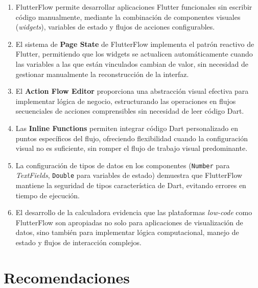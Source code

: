 \documentclass[12pt,a4paper]{article}
\begin{document}
\begin{enumerate}
  \item FlutterFlow permite desarrollar aplicaciones Flutter funcionales sin escribir código manualmente, mediante la combinación de componentes visuales (\textit{widgets}), variables de estado y flujos de acciones configurables.

  \item El sistema de \textbf{Page State} de FlutterFlow implementa el patrón reactivo de Flutter, permitiendo que los widgets se actualicen automáticamente cuando las variables a las que están vinculados cambian de valor, sin necesidad de gestionar manualmente la reconstrucción de la interfaz.

  \item El \textbf{Action Flow Editor} proporciona una abstracción visual efectiva para implementar lógica de negocio, estructurando las operaciones en flujos secuenciales de acciones comprensibles sin necesidad de leer código Dart.

  \item Las \textbf{Inline Functions} permiten integrar código Dart personalizado en puntos específicos del flujo, ofreciendo flexibilidad cuando la configuración visual no es suficiente, sin romper el flujo de trabajo visual predominante.

  \item La configuración de tipos de datos en los componentes (\texttt{Number} para \textit{TextFields}, \texttt{Double} para variables de estado) demuestra que FlutterFlow mantiene la seguridad de tipos característica de Dart, evitando errores en tiempo de ejecución.

  \item El desarrollo de la calculadora evidencia que las plataformas \textit{low-code} como FlutterFlow son apropiadas no solo para aplicaciones de visualización de datos, sino también para implementar lógica computacional, manejo de estado y flujos de interacción complejos.
\end{enumerate}

\section{Recomendaciones}
\end{document}
